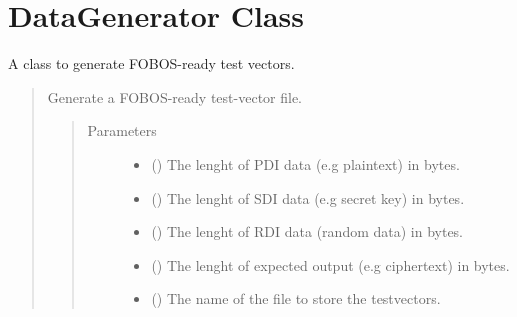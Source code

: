 \documentclass[letterpaper,10pt,english]{sphinxmanual}
\begin{document}
\section{DataGenerator Class}
\label{\detokenize{reference_doc:datagenerator-class}}

\begin{fulllineitems}
\label{\detokenize{reference_doc:DataGenerator}}
A class to generate FOBOS-ready test vectors.
\begin{quote}

\begin{fulllineitems}
\label{\detokenize{reference_doc:DataGenerator.randTVFile}}
Generate a FOBOS-ready test-vector file.
\begin{quote}\begin{description}
\item[{Parameters}] \leavevmode\begin{itemize}
\item {} 
 () \textendash{} The lenght of PDI data (e.g plaintext) in bytes.

\item {} 
 () \textendash{} The lenght of SDI data (e.g secret key) in bytes.

\item {} 
 () \textendash{} The lenght of RDI data (random data) in bytes.

\item {} 
 () \textendash{} The lenght of expected output (e.g ciphertext) in bytes.

\item {} 
 () \textendash{} The name of the file to store the testvectors.


\end{itemize}
\end{description}
\end{quote}
\end{fulllineitems}
\end{quote}
\end{fulllineitems}
\end{document}
